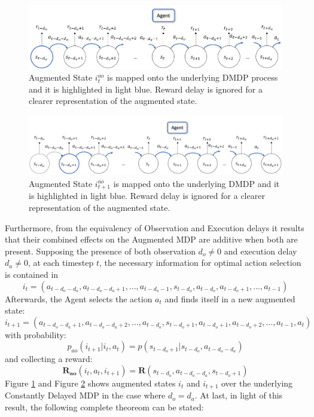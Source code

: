                 \\\\
                \begin{figure}[t]
                    \centering
                    \includegraphics[width=15cm, keepaspectratio]{images/dmdp/augmented_i_ao.png}
                    \caption{Augmented State $i_t^{ao}$ is mapped onto the underlying DMDP process and it is highlighted in light blue. Reward delay is ignored for a clearer representation of the augmented state.}
                    \label{fig:augmented_i_ao}
                \end{figure}
                \begin{figure}[t]
                    \centering
                    \includegraphics[width=15cm, keepaspectratio]{images/dmdp/augmented_i_ao_next.png}
                    \caption{Augmented State $i_{t+1}^{ao}$ is mapped onto the underlying DMDP and it is highlighted in light blue. Reward delay is ignored for a clearer representation of the augmented state.}
                    \label{fig:augmented_i_ao_next}
                \end{figure}
                Furthermore, from the equivalency of Observation and Execution delays it results that their combined effects on the Augmented MDP are additive when both are present. Supposing the presence of both observation $d_o \neq 0$ and execution delay $d_a \neq 0$, at each timestep $t$, the necessary information for optimal action selection is contained in 
                \[i_t = \left( a_{t-d_{o}-d_{a}}, a_{t-d_{o}-d_{a} +1}, ..., a_{t-d_{o}-1}, s_{t-d_{o}}, a_{t-d_{o}}, a_{t-d_{o}+1}, ..., a_{t-1} \right)\] Afterwards, the Agent selects the action $a_t$ and finds itself in a new augmented state: \[i_{t+1} = \left( a_{t-d_{o}-d_{a}+1}, a_{t-d_{o}-d_{a}+2}, ..., a_{t-d_{o}}, s_{t-d_{o}+1}, a_{t-d_{o}+1}, a_{t-d_{o}+2}, ..., a_{t-1}, a_{t}\right)\] with probability: \[p_{ao} \left( i_{t+1} | i_t, a_{t} \right) = p \left( s_{t-d_o+1} | s_{t-d_o}, a_{t-d_o-d_a} \right)\] and collecting a reward: \[\mathbf{R_{ao}}(i_t,a_t, i_{t+1}) = \mathbf{R}(s_{t-d_{o}}, a_{t-d_o-d_a}, s_{t-d_{o}+1})\] Figure \ref{fig:augmented_i_ao} and Figure \ref{fig:augmented_i_ao_next} shows augmented states $i_t$ and $i_{t+1}$ over the underlying Constantly Delayed MDP in the case where $d_o = d_a$. At last, in light of this result, the following complete theoreom can be stated:
                

